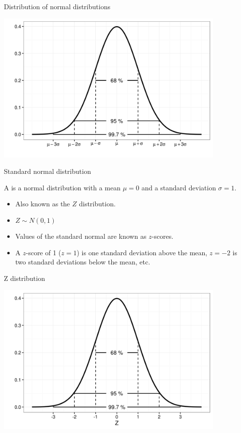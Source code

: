 \documentclass[xcolor=table, handout]{beamer}
\begin{document}
\begin{frame}{Distribution of normal distributions}

\bigskip
{\centering
\includegraphics[width=4.5in]{../images/ch6_normal}
\par}

\end{frame}

\begin{frame}{Standard normal distribution}
\begin{block}{}
{\large A  is a normal distribution with a mean $\mu=0$ and a standard deviation $\sigma =1$.  }
\begin{itemize}
\pause\item Also known as the $Z$ distribution.
\pause\item $Z \sim N(0,1)$
\pause\item Values of the standard normal are known as $z$-scores.
\pause\item A $z$-score of 1 ($z=1$) is one standard deviation above the mean, $z=-2$ is two standard deviations below the mean, etc.
\end{itemize}
\end{block}
\end{frame}

\begin{frame}{Z distribution}

\bigskip
{\centering
\includegraphics[width=4.5in]{../images/ch6_zdist}
\par}
\end{frame}
\end{document}
